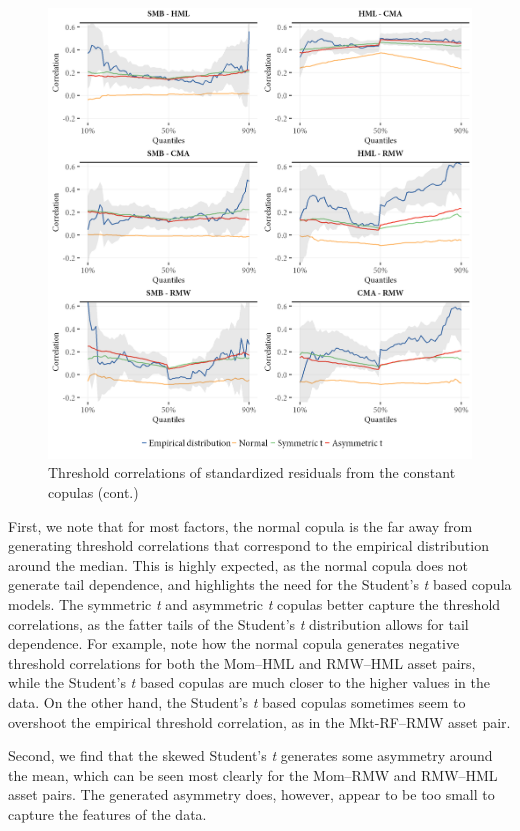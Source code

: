 \begin{figure}[!ht]
  \ContinuedFloat
  \centering
  \caption{Threshold correlations of standardized residuals from the constant copulas (cont.)}
  \includegraphics[scale=1]{graphics/threshold_simulated_2.png}  
\end{figure}

First, we note that for most factors, the normal copula is the far away from generating threshold correlations that correspond to the empirical distribution around the median. This is highly expected, as the normal copula does not generate tail dependence, and highlights the need for the Student's \textit{t} based copula models. The symmetric \textit{t} and asymmetric \textit{t} copulas better capture the threshold correlations, as the fatter tails of the Student's \textit{t} distribution allows for tail dependence. For example, note how the normal copula generates negative threshold correlations for both the Mom--HML and RMW--HML asset pairs, while the Student's \textit{t} based copulas are much closer to the higher values in the data. On the other hand, the Student's \textit{t} based copulas sometimes seem to overshoot the empirical threshold correlation, as in the Mkt-RF--RMW asset pair.

Second, we find that the skewed Student's \textit{t} generates some asymmetry around the mean, which can be seen most clearly for the Mom--RMW and RMW--HML asset pairs. The generated asymmetry does, however, appear to be too small to capture the features of the data.

